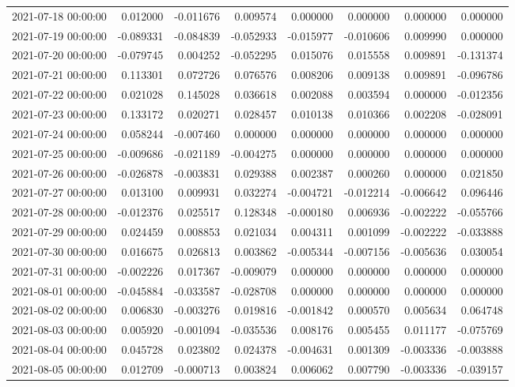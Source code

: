 \begin{tabular}{lrrrrrrr}
2021-07-18 00:00:00 & 0.012000 & -0.011676 & 0.009574 & 0.000000 & 0.000000 & 0.000000 & 0.000000 \\
2021-07-19 00:00:00 & -0.089331 & -0.084839 & -0.052933 & -0.015977 & -0.010606 & 0.009990 & 0.000000 \\
2021-07-20 00:00:00 & -0.079745 & 0.004252 & -0.052295 & 0.015076 & 0.015558 & 0.009891 & -0.131374 \\
2021-07-21 00:00:00 & 0.113301 & 0.072726 & 0.076576 & 0.008206 & 0.009138 & 0.009891 & -0.096786 \\
2021-07-22 00:00:00 & 0.021028 & 0.145028 & 0.036618 & 0.002088 & 0.003594 & 0.000000 & -0.012356 \\
2021-07-23 00:00:00 & 0.133172 & 0.020271 & 0.028457 & 0.010138 & 0.010366 & 0.002208 & -0.028091 \\
2021-07-24 00:00:00 & 0.058244 & -0.007460 & 0.000000 & 0.000000 & 0.000000 & 0.000000 & 0.000000 \\
2021-07-25 00:00:00 & -0.009686 & -0.021189 & -0.004275 & 0.000000 & 0.000000 & 0.000000 & 0.000000 \\
2021-07-26 00:00:00 & -0.026878 & -0.003831 & 0.029388 & 0.002387 & 0.000260 & 0.000000 & 0.021850 \\
2021-07-27 00:00:00 & 0.013100 & 0.009931 & 0.032274 & -0.004721 & -0.012214 & -0.006642 & 0.096446 \\
2021-07-28 00:00:00 & -0.012376 & 0.025517 & 0.128348 & -0.000180 & 0.006936 & -0.002222 & -0.055766 \\
2021-07-29 00:00:00 & 0.024459 & 0.008853 & 0.021034 & 0.004311 & 0.001099 & -0.002222 & -0.033888 \\
2021-07-30 00:00:00 & 0.016675 & 0.026813 & 0.003862 & -0.005344 & -0.007156 & -0.005636 & 0.030054 \\
2021-07-31 00:00:00 & -0.002226 & 0.017367 & -0.009079 & 0.000000 & 0.000000 & 0.000000 & 0.000000 \\
2021-08-01 00:00:00 & -0.045884 & -0.033587 & -0.028708 & 0.000000 & 0.000000 & 0.000000 & 0.000000 \\
2021-08-02 00:00:00 & 0.006830 & -0.003276 & 0.019816 & -0.001842 & 0.000570 & 0.005634 & 0.064748 \\
2021-08-03 00:00:00 & 0.005920 & -0.001094 & -0.035536 & 0.008176 & 0.005455 & 0.011177 & -0.075769 \\
2021-08-04 00:00:00 & 0.045728 & 0.023802 & 0.024378 & -0.004631 & 0.001309 & -0.003336 & -0.003888 \\
2021-08-05 00:00:00 & 0.012709 & -0.000713 & 0.003824 & 0.006062 & 0.007790 & -0.003336 & -0.039157 \\

\end{tabular}
